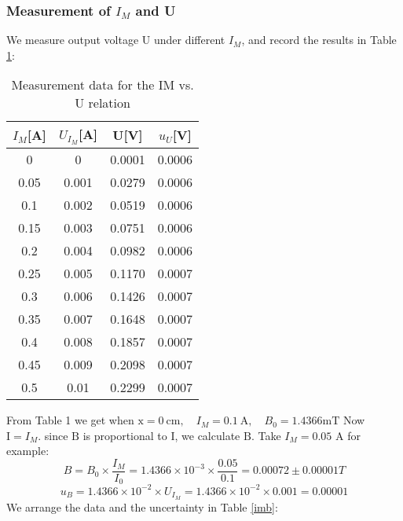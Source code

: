 \documentclass[12pt,a4paper]{article}
\begin{document}
\subsubsection{Measurement of $I_M$ and U}
We measure output voltage U under different $I_M$, and record the results in Table \ref{uim}:

\begin{table}[H]
    \centering
    \begin{tabular}{|c|c|c|c|}
    \hline
    $I_M$[A] &  $U_{I_M}$[A]  & U[V]  & $u_U$[V]  \\ \hline
    0    & 0& 0.0001 & 0.0006 \\ \hline
    0.05 & 0.001 & 0.0279 & 0.0006 \\ \hline
    0.1  & 0.002 & 0.0519 & 0.0006 \\ \hline
    0.15 & 0.003 & 0.0751 & 0.0006 \\ \hline
    0.2  & 0.004 & 0.0982 & 0.0006 \\ \hline
    0.25 & 0.005 & 0.1170 & 0.0007 \\ \hline
    0.3  & 0.006 & 0.1426 & 0.0007 \\ \hline
    0.35 & 0.007 & 0.1648 & 0.0007 \\ \hline
    0.4  & 0.008 & 0.1857 & 0.0007 \\ \hline
    0.45 & 0.009 & 0.2098 & 0.0007 \\ \hline
    0.5  & 0.01  & 0.2299 & 0.0007 \\ \hline
    \end{tabular}
    \caption{Measurement data for the IM vs. U relation}
    \label{uim}
\end{table}
From Table 1 we get when $\mathrm{x}=0 \mathrm{~cm}, \quad I_{M}=0.1 \mathrm{~A}, \quad B_{0}=1.4366 \mathrm{mT}$
Now $\mathrm{I}=I_{M} .$ since $\mathrm{B}$ is proportional to $\mathrm{I}$, we calculate $\mathrm{B}$. Take $I_{M}=0.05$ A for example:
$$
B=B_{0} \times \frac{I_{M}}{I_{0}}=1.4366 \times 10^{-3} \times \frac{0.05}{0.1}=0.00072 \pm 0.00001 T
$$
$$u_B=1.4366\times 10^{-2} \times U_{I_M}=1.4366\times 10^{-2} \times 0.001=0.00001$$
We arrange the data and the uncertainty in Table \ref{imb}:
\end{document}

